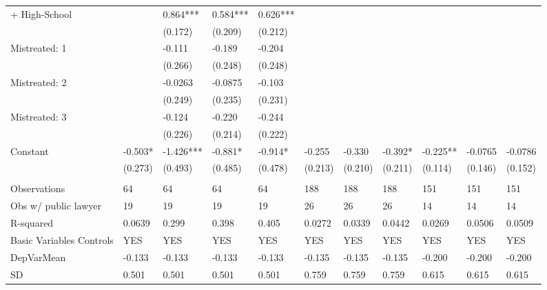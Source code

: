 \begin{tabular}{lllllllllll}
+ High-School &       & 0.864*** & 0.584*** & 0.626*** &       &       &       &       &       &  \\
      &       & (0.172) & (0.209) & (0.212) &       &       &       &       &       &  \\
Mistreated: 1 &       & -0.111 & -0.189 & -0.204 &       &       &       &       &       &  \\
      &       & (0.266) & (0.248) & (0.248) &       &       &       &       &       &  \\
Mistreated: 2 &       & -0.0263 & -0.0875 & -0.103 &       &       &       &       &       &  \\
      &       & (0.249) & (0.235) & (0.231) &       &       &       &       &       &  \\
Mistreated: 3 &       & -0.124 & -0.220 & -0.244 &       &       &       &       &       &  \\
      &       & (0.226) & (0.214) & (0.222) &       &       &       &       &       &  \\
Constant & -0.503* & -1.426*** & -0.881* & -0.914* & -0.255 & -0.330 & -0.392* & -0.225** & -0.0765 & -0.0786 \\
      & (0.273) & (0.493) & (0.485) & (0.478) & (0.213) & (0.210) & (0.211) & (0.114) & (0.146) & (0.152) \\
      &       &       &       &       &       &       &       &       &       &  \\
\midrule
Observations & 64    & 64    & 64    & 64    & 188   & 188   & 188   & 151   & 151   & 151 \\
Obs w/ public lawyer & 19    & 19    & 19    & 19    & 26    & 26    & 26    & 14    & 14    & 14 \\
R-squared & 0.0639 & 0.299 & 0.398 & 0.405 & 0.0272 & 0.0339 & 0.0442 & 0.0269 & 0.0506 & 0.0509 \\
Basic Variables Controls & YES   & YES   & YES   & YES   & YES   & YES   & YES   & YES   & YES   & YES \\
DepVarMean & -0.133 & -0.133 & -0.133 & -0.133 & -0.135 & -0.135 & -0.135 & -0.200 & -0.200 & -0.200 \\
SD    & 0.501 & 0.501 & 0.501 & 0.501 & 0.759 & 0.759 & 0.759 & 0.615 & 0.615 & 0.615 \\
\bottomrule
\bottomrule
\end{tabular}%

